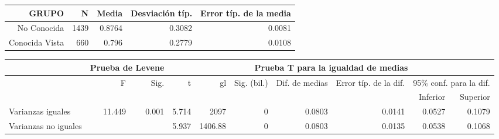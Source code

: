 \documentclass[10pt]{beamer}
\begin{document}
\begin{frame}
	\begin{table}
	  \begin{tabular}[t]{|r|r|r|r|r|}
	    \hline
		GRUPO & N & Media & Desviación típ. & Error típ. de la media \\ \hline
		No Conocida & 1439 & 0.8764 & 0.3082 & 0.0081 \\ \hline
		Conocida Vista & 660 & 0.796 & 0.2779 & 0.0108 \\ \hline

	  \end{tabular}
	  \begin{tabular}[t]{|l|r|r|r|r|r|r|r|r|r|}
	    \hline
		  & \multicolumn{2}{|c|}{Prueba de Levene} &  \multicolumn{7}{|c|}{Prueba T para la igualdad de medias} \\ \hline
		  & F & Sig. & t & gl & Sig. (bil.) & Dif. de medias & Error típ. de la dif. & \multicolumn{2}{|c|}{95\% conf. para la dif.} \\ \hline
		  &   &   &   &   &   &   &   & Inferior & Superior \\ \hline
	Varianzas iguales & 11.449 & 0.001 & 5.714 & 2097 & 0 & 0.0803 & 0.0141 & 0.0527 & 0.1079 \\ \hline
	Varianzas no iguales &   &   & 5.937 & 1406.88 & 0 & 0.0803 & 0.0135 & 0.0538 & 0.1068 \\ \hline
	  \end{tabular}
	\end{table}
      \end{frame}
\end{document}
